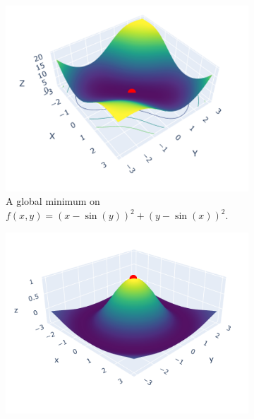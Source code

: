 \begin{figure}[h]

    \begin{subfigure}[b]{0.48\linewidth}

        \centering

        \includegraphics[width=\linewidth]{figures/2background/glob_min.png}

        \caption{A global minimum on \\

        $f(x,y) = (x-\sin(y))^2 + (y-\sin(x))^2$.}

        \label{fig:global_min}

    \end{subfigure}

    \hfill

    \begin{subfigure}[b]{0.48\linewidth}

        \centering

        \includegraphics[width=\linewidth]{figures/2background/glob_max.png}


\end{subfigure}
\end{figure}
